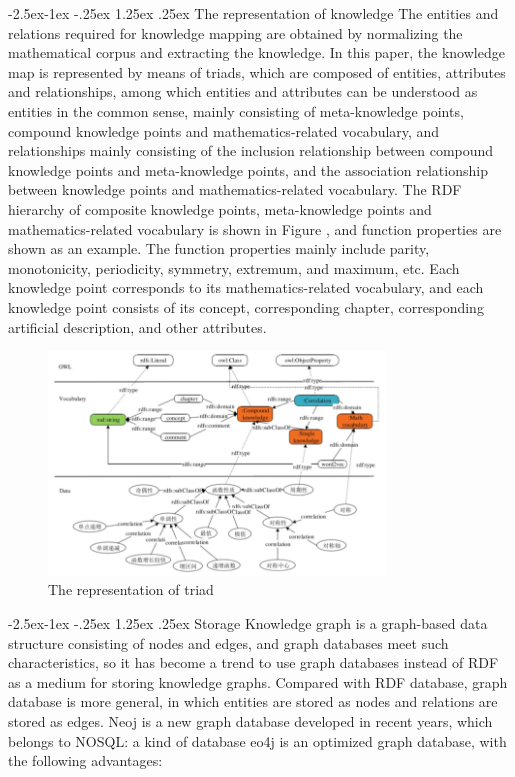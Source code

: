 \documentclass[11pt,en]{elegantpaper}
\makeatletter
\renewcommand\paragraph{\@startsection{paragraph}{4}{\z@}%
            {-2.5ex\@plus -1ex \@minus -.25ex}%
            {1.25ex \@plus .25ex}%
            {\normalfont\normalsize\bfseries}}
\makeatother
\begin{document}
\paragraph{The representation of knowledge}
The entities and relations required for knowledge mapping are obtained by normalizing the mathematical corpus and extracting the knowledge. In this paper, the knowledge map is represented by means of triads, which are composed of entities, attributes and relationships, among which entities and attributes can be understood as entities in the common sense, mainly consisting of meta-knowledge points, compound knowledge points and mathematics-related vocabulary, and relationships mainly consisting of the inclusion relationship between compound knowledge points and meta-knowledge points, and the association relationship between knowledge points and mathematics-related vocabulary. The RDF hierarchy of composite knowledge points, meta-knowledge points and mathematics-related vocabulary is shown in Figure \cite{2}, and function properties are shown as an example. The function properties mainly include parity, monotonicity, periodicity, symmetry, extremum, and maximum, etc. Each knowledge point corresponds to its mathematics-related vocabulary, and each knowledge point consists of its concept, corresponding chapter, corresponding artificial description, and other attributes.
\begin{figure}[h]
	\centering

	\includegraphics[width=0.8\textwidth]{./image/kg2.png}
	\caption{The representation of triad}
	\label{kg2}
\end{figure}

\paragraph{Storage}
Knowledge graph is a graph-based data structure consisting of nodes and edges, and graph databases meet such characteristics, so it has become a trend to use graph databases instead of RDF as a medium for storing knowledge graphs. Compared with RDF database, graph database is more general, in which entities are stored as nodes and relations are stored as edges.
Neoj is a new graph database developed in recent years, which belongs to NOSQL: a kind of database eo4j is an optimized graph database, with the following advantages: 
\end{document}
